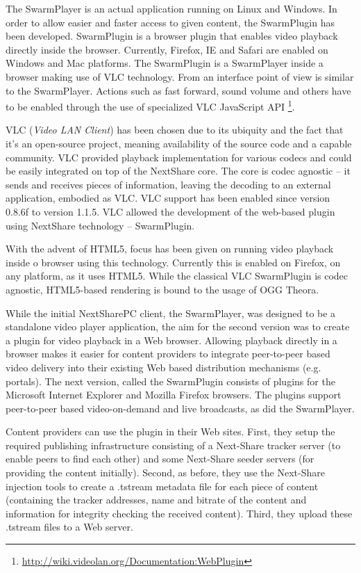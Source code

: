 The SwarmPlayer is an actual application running on Linux and Windows. In
order to allow easier and faster access to given content, the SwarmPlugin has
been developed. SwarmPlugin is a browser plugin that enables video playback
directly inside the browser. Currently, Firefox, IE and Safari are enabled on
Windows and Mac platforms. The SwarmPlugin is a SwarmPlayer inside a browser
making use of VLC technology. From an interface point of view is similar to
the SwarmPlayer. Actions such as fast forward, sound volume and others have to
be enabled through the use of specialized VLC JavaScript API
\footnote{\url{http://wiki.videolan.org/Documentation:WebPlugin}}.

VLC (\textit{Video LAN Client}) has been chosen due to its ubiquity and the fact that it's an open-source
project, meaning availability of the source code and a capable community. VLC
provided playback implementation for various codecs and could be easily
integrated on top of the NextShare core. The core is codec agnostic -- it
sends and receives pieces of information, leaving the decoding to an external
application, embodied as VLC. VLC support has been enabled since version
0.8.6f to version 1.1.5. VLC allowed the development of the web-based
plugin using NextShare technology -- SwarmPlugin.

With the advent of HTML5, focus has been given on running video playback
inside o browser using this technology. Currently this is enabled on Firefox,
on any platform, as it uses HTML5. While the classical VLC SwarmPlugin is
codec agnostic, HTML5-based rendering is bound to the usage of OGG Theora.

While the initial NextSharePC client, the SwarmPlayer, was designed to be a
standalone video player application, the aim for the second version was to
create a plugin for video playback in a Web browser. Allowing playback
directly in a browser makes it easier for content providers to integrate
peer-to-peer based video delivery into their existing Web based distribution
mechanisms (e.g. portals). The next version, called the SwarmPlugin consists of
plugins for the Microsoft Internet Explorer and Mozilla Firefox browsers. The
plugins support peer-to-peer based video-on-demand and live broadcasts, as
did the SwarmPlayer.

Content providers can use the plugin in their Web sites. First, they setup the
required publishing infrastructure consisting of a Next-Share tracker server
(to enable peers to find each other) and some Next-Share seeder servers (for
providing the content initially). Second, as before, they use the Next-Share
injection tools to create a .tstream metadata file for each piece of content
(containing the tracker addresses, name and bitrate of the content and
information for integrity checking the received content). Third, they upload
these .tstream files to a Web server.

